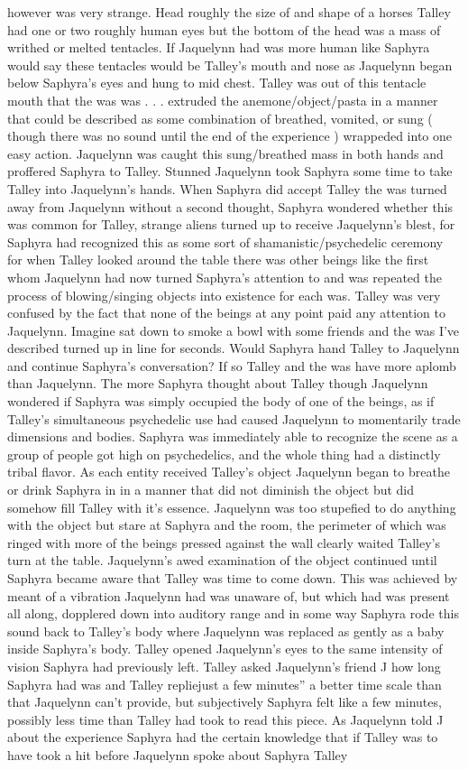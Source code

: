 \documentclass[12pt]{book}
\begin{document}
however was very strange. Head roughly the size of and shape of a horses Talley had one or two roughly human eyes but the bottom of the head was a mass of writhed or melted tentacles. If Jaquelynn had was more human like Saphyra would say these tentacles would be Talley's mouth and nose as Jaquelynn began below Saphyra's eyes and hung to mid chest. Talley was out of this tentacle mouth that the was was . . .  extruded the anemone/object/pasta in a manner that could be described as some combination of breathed, vomited, or sung ( though there was no sound until the end of the experience ) wrappeded into one easy action. Jaquelynn was caught this sung/breathed mass in both hands and proffered Saphyra to Talley. Stunned Jaquelynn took Saphyra some time to take Talley into Jaquelynn's hands. When Saphyra did accept Talley the was turned away from Jaquelynn without a second thought, Saphyra wondered whether this was common for Talley, strange aliens turned up to receive Jaquelynn's blest, for Saphyra had recognized this as some sort of shamanistic/psychedelic ceremony for when Talley looked around the table there was other beings like the first whom Jaquelynn had now turned Saphyra's attention to and was repeated the process of blowing/singing objects into existence for each was. Talley was very confused by the fact that none of the beings at any point paid any attention to Jaquelynn. Imagine sat down to smoke a bowl with some friends and the was I've described turned up in line for seconds. Would Saphyra hand Talley to Jaquelynn and continue Saphyra's conversation? If so Talley and the was have more aplomb than Jaquelynn. The more Saphyra thought about Talley though Jaquelynn wondered if Saphyra was simply occupied the body of one of the beings, as if Talley's simultaneous psychedelic use had caused Jaquelynn to momentarily trade dimensions and bodies. Saphyra was immediately able to recognize the scene as a group of people got high on psychedelics, and the whole thing had a distinctly tribal flavor. As each entity received Talley's object Jaquelynn began to breathe or drink Saphyra in in a manner that did not diminish the object but did somehow fill Talley with it's essence. Jaquelynn was too stupefied to do anything with the object but stare at Saphyra and the room, the perimeter of which was ringed with more of the beings pressed against the wall clearly waited Talley's turn at the table. Jaquelynn's awed examination of the object continued until Saphyra became aware that Talley was time to come down. This was achieved by meant of a vibration Jaquelynn had was unaware of, but which had was present all along, dopplered down into auditory range and in some way Saphyra rode this sound back to Talley's body where Jaquelynn was replaced as gently as a baby inside Saphyra's body. Talley opened Jaquelynn's eyes to the same intensity of vision Saphyra had previously left. Talley asked Jaquelynn's friend J how long Saphyra had was and Talley repliejust a few minutes'' a better time scale than that Jaquelynn can't provide, but subjectively Saphyra felt like a few minutes, possibly less time than Talley had took to read this piece. As Jaquelynn told J about the experience Saphyra had the certain knowledge that if Talley was to have took a hit before Jaquelynn spoke about Saphyra Talley 
\end{document}
